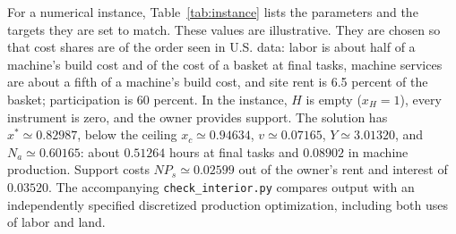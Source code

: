 \documentclass[12pt]{article}
\theoremstyle{plain}
\theoremstyle{definition}
\theoremstyle{remark}
\begin{document}
For a numerical instance, Table~\ref{tab:instance} lists the parameters and the targets they are set to match.
These values are illustrative.
They are chosen so that cost shares are of the order seen in U.S. data: labor is about half of a machine's build cost and of the cost of a basket at final tasks, machine services are about a fifth of a machine's build cost, and site rent is 6.5 percent of the basket; participation is 60 percent.
In the instance, $H$ is empty ($x_H=1$), every instrument is zero, and the owner provides support.
The solution has $x^*\simeq0.82987$, below the ceiling $x_c\simeq0.94634$, $v\simeq0.07165$, $Y\simeq3.01320$, and $N_a\simeq0.60165$: about $0.51264$ hours at final tasks and $0.08902$ in machine production.
Support costs $NP_s\simeq0.02599$ out of the owner's rent and interest of $0.03520$.
The accompanying \texttt{check\_interior.py} compares output with an independently specified discretized production optimization, including both uses of labor and land.
\end{document}
